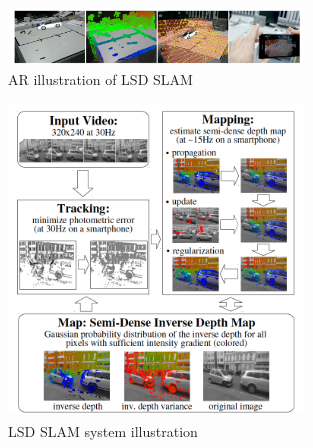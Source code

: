 \documentclass[12pt,twoside]{article}
\begin{document}
\begin{figure}[h]
    \centering
    \includegraphics[width=0.7\textwidth]{figures/lsdar1}
    \caption{AR illustration of LSD SLAM}
    \label{fig: lsdar1}
\end{figure}

\begin{figure}[h]
    \centering
    \includegraphics[width=0.7\textwidth]{figures/lsdar2}
    \caption{LSD SLAM system illustration}
    \label{fig: lsdar2}
\end{figure}
\end{document}
